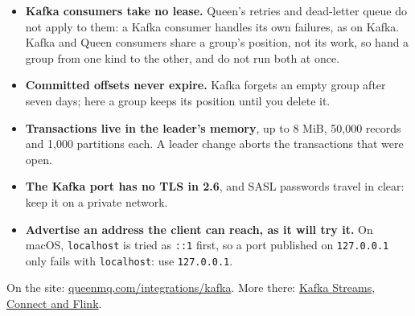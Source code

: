 \begin{itemize}
\item \textbf{Kafka consumers take no lease.} Queen's retries and dead-letter queue do not apply to
them: a Kafka consumer handles its own failures, as on Kafka. Kafka and Queen consumers share a
group's position, not its work, so hand a group from one kind to the other, and do not run both at
once.
\item \textbf{Committed offsets never expire.} Kafka forgets an empty group after seven days; here a
group keeps its position until you delete it.
\item \textbf{Transactions live in the leader's memory}, up to 8 MiB, 50,000 records and 1,000
partitions each. A leader change aborts the transactions that were open.
\item \textbf{The Kafka port has no TLS in 2.6}, and SASL passwords travel in clear: keep it on a
private network.
\item \textbf{Advertise an address the client can reach, as it will try it.} On macOS,
\texttt{localhost} is tried as \texttt{::1} first, so a port published on \texttt{127.0.0.1} only
fails with \texttt{localhost}: use \texttt{127.0.0.1}.
\end{itemize}

On the site: \href{https://queenmq.com/integrations/kafka/}{queenmq.com/integrations/kafka}. More there: \href{https://queenmq.com/integrations/kafka-frameworks/}{Kafka Streams, Connect and Flink}.
